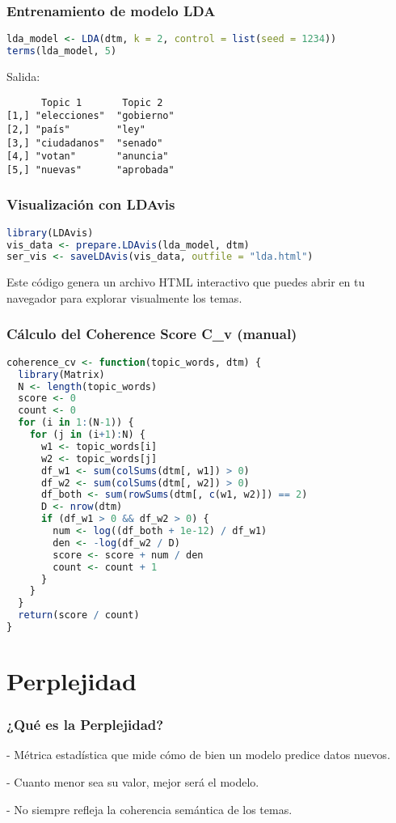 \documentclass[10pt]{beamer}
\begin{document}
\begin{frame}[fragile]
\frametitle{Entrenamiento de modelo LDA}
\begin{lstlisting}[language=R]
lda_model <- LDA(dtm, k = 2, control = list(seed = 1234))
terms(lda_model, 5)
\end{lstlisting}

Salida:
\begin{verbatim}
      Topic 1       Topic 2
[1,] "elecciones"  "gobierno"
[2,] "país"        "ley"
[3,] "ciudadanos"  "senado"
[4,] "votan"       "anuncia"
[5,] "nuevas"      "aprobada"
\end{verbatim}
\end{frame}

\begin{frame}[fragile]
\frametitle{Visualización con LDAvis}
\begin{lstlisting}[language=R]
library(LDAvis)
vis_data <- prepare.LDAvis(lda_model, dtm)
ser_vis <- saveLDAvis(vis_data, outfile = "lda.html")
\end{lstlisting}

Este código genera un archivo HTML interactivo que puedes abrir en tu navegador para explorar visualmente los temas.
\end{frame}

\begin{frame}[fragile]
\frametitle{Cálculo del Coherence Score C_v (manual)}
\begin{lstlisting}[language=R]
coherence_cv <- function(topic_words, dtm) {
  library(Matrix)
  N <- length(topic_words)
  score <- 0
  count <- 0
  for (i in 1:(N-1)) {
    for (j in (i+1):N) {
      w1 <- topic_words[i]
      w2 <- topic_words[j]
      df_w1 <- sum(colSums(dtm[, w1]) > 0)
      df_w2 <- sum(colSums(dtm[, w2]) > 0)
      df_both <- sum(rowSums(dtm[, c(w1, w2)]) == 2)
      D <- nrow(dtm)
      if (df_w1 > 0 && df_w2 > 0) {
        num <- log((df_both + 1e-12) / df_w1)
        den <- -log(df_w2 / D)
        score <- score + num / den
        count <- count + 1
      }
    }
  }
  return(score / count)
}
\end{lstlisting}
\end{frame}

\section{Perplejidad}
\begin{frame}
\frametitle{¿Qué es la Perplejidad?}

    
- Métrica estadística que mide cómo de bien un modelo predice datos nuevos.
    
- Cuanto menor sea su valor, mejor será el modelo.
    
- No siempre refleja la coherencia semántica de los temas.

\end{frame}
\end{document}
